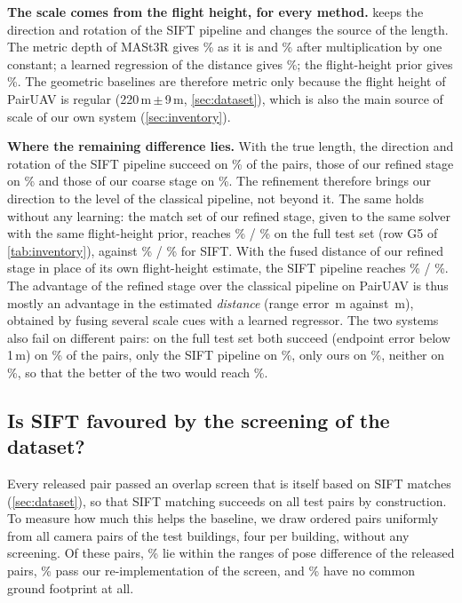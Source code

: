 \noindent\textbf{The scale comes from the flight height, for every method.}  keeps the direction and rotation of the SIFT pipeline and changes the source of the length. The metric depth of MASt3R gives \gbScaleNativeSRd\% as it is and \gbScaleCalibSRd\% after multiplication by one constant; a learned regression of the distance gives \gbScaleLearnedSRd\%; the flight-height prior gives \gbScaleHeightSRd\%. The geometric baselines are therefore metric only because the flight height of PairUAV is regular (220\,m\,$\pm$\,9\,m, \cref{sec:dataset}), which is also the main source of scale of our own system (\cref{sec:inventory}).

\noindent\textbf{Where the remaining difference lies.} With the true length, the direction and rotation of the SIFT pipeline succeed on \gbHybOracleSRe\% of the pairs, those of our refined stage on \gbOracleSiiSRe\% and those of our coarse stage on \gbOracleSiSRe\%. The refinement therefore brings our direction to the level of the classical pipeline, not beyond it. The same holds without any learning: the match set of our refined stage, given to the same solver with the same flight-height prior, reaches \gFiveSRd\% / \gFiveSRe\% on the full test set (row G5 of \cref{tab:inventory}), against \sfSiftSRd\% / \sfSiftSRe\% for SIFT. With the fused distance of our refined stage in place of its own flight-height estimate, the SIFT pipeline reaches \gbHybTwoSRd\% / \gbHybTwoSRe\%. The advantage of the refined stage over the classical pipeline on PairUAV is thus mostly an advantage in the estimated \emph{distance} (range error \gbHybTwoD\,m against \gbSiftD\,m), obtained by fusing several scale cues with a learned regressor. The two systems also fail on different pairs: on the full test set both succeed (endpoint error below 1\,m) on \sfJointBoth\% of the pairs, only the SIFT pipeline on \sfJointSift\%, only ours on \sfJointOurs\%, neither on \sfJointNone\%, so that the better of the two would reach \sfJointEither\%.



\subsection{Is SIFT favoured by the screening of the dataset?}
\label{sec:unscreened}

Every released pair passed an overlap screen that is itself based on SIFT matches (\cref{sec:dataset}), so that SIFT matching succeeds on all test pairs by construction. To measure how much this helps the baseline, we draw \unN{} ordered pairs uniformly from all camera pairs of the test buildings, four per building, without any screening. Of these pairs, \unInside\% lie within the ranges of pose difference of the released pairs, \unScreenPass\% pass our re-implementation of the screen, and \unNoOverlap\% have no common ground footprint at all.

